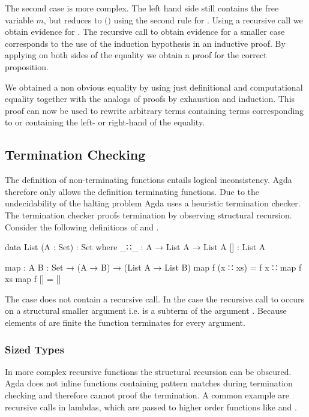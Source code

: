 \documentclass[10pt,a4paper,twoside]{report}
\begin{document}
The second case is more complex.
The left hand side still contains the free variable $m$, but reduces to
\AgdaSpace{}$($\AgdaSpace{}\AgdaFunction{+}\AgdaSpace{}$)$
using the second rule for \AgdaFunction{\_+\_}.
Using a recursive call we obtain evidence for
\AgdaSpace{}\AgdaFunction{+}\AgdaSpace{}\AgdaSpace{}\AgdaSpace{}.
The recursive call to obtain evidence for a smaller case corresponds to the use
of the induction hypothesis in an inductive proof.
By applying  on both sides of the equality we
obtain a proof for the correct proposition.

We obtained a non obvious equality by using just definitional and computational
equality together with the analogs of proofs by exhaustion and induction.
This proof can now be used to rewrite arbitrary terms containing terms
corresponding to or containing the left- or right-hand of the equality.

\subsection{Termination Checking}
\label{sec:termination-checking}

The definition of non-terminating functions entails logical inconsistency.
Agda therefore only allows the definition terminating functions.
Due to the undecidability of the halting problem Agda uses a heuristic
termination checker.
The termination checker proofs termination by observing structural recursion.
Consider the following definitions of  and
.

\begin{code}
data List (A : Set) : Set where
  _∷_  : A → List A → List A
  []   : List A

map : {A B : Set} → (A → B) → (List A → List B)
map f (x ∷ xs)  = f x ∷ map f xs
map f []        = []
\end{code}
The \AgdaInductiveConstructor{[]} case does not contain a recursive call.
In the  case the recursive call to
 occurs on a structural smaller argument i.e.
 is a subterm of the argument
\;\;.
Because elements of  are finite the function
 terminates for every argument.

\subsubsection{Sized Types}
In more complex recursive functions the structural recursion can be obscured.
Agda does not inline functions containing pattern matches during termination
checking and therefore cannot proof the termination.
A common example are recursive calls in lambdas, which are passed
to higher order functions like  and \AgdaFunction{>>=}.
\end{document}
